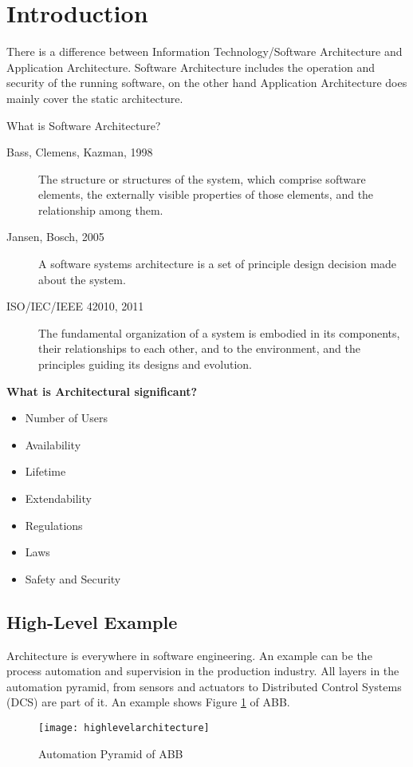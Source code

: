 \section{Introduction}
There is a difference between Information Technology/Software Architecture and Application Architecture. Software Architecture includes the operation and security of the running software, on the other hand Application Architecture does mainly cover the static architecture.

What is Software Architecture?
\begin{description}
	\item [Bass, Clemens, Kazman, 1998] The structure or structures of the system, which comprise software elements, the externally visible properties of those elements, and the relationship among them.
	\item [Jansen, Bosch, 2005] A software systems architecture is a set of principle design decision made about the system.
	\item [ISO/IEC/IEEE 42010, 2011] The fundamental organization of a system is embodied in its components, their relationships to each other, and to the environment, and the principles guiding its designs and evolution.
\end{description}

\textbf{What is Architectural significant?}
\begin{itemize}
	\item Number of Users
	\item Availability
	\item Lifetime
	\item Extendability
	\item Regulations
	\item Laws
	\item Safety and Security
\end{itemize}

\subsection{High-Level Example}
Architecture is everywhere in software engineering. An example can be the process automation and supervision in  the production industry. All layers in the automation pyramid, from sensors and actuators to Distributed Control Systems (DCS) are part of it. An example shows Figure \ref{fig:automationpyramid} of ABB.

\begin{figure}[H]
  \center
  \texttt{[image: highlevelarchitecture]}
  \caption{Automation Pyramid of ABB}
  \label{fig:automationpyramid}
\end{figure}


